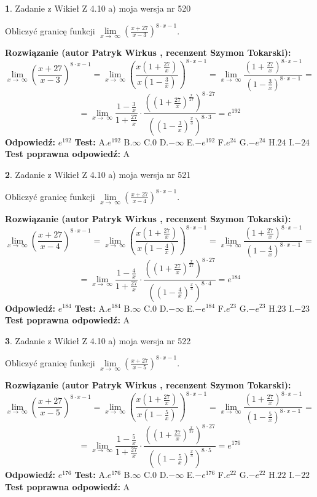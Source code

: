 \documentclass[12pt, a4paper]{article}
\theoremstyle{definition} %
\newtheorem{zad}{}
\newcommand{\zadStart}[1]{\begin{zad}#1\newline}
\newcommand{\zadStop}{\end{zad}}
\newcommand{\rozwStart}[2]{\noindent \textbf{Rozwiązanie (autor #1 , recenzent #2): }\newline}
\newcommand{\rozwStop}{\newline}
\newcommand{\odpStart}{\noindent \textbf{Odpowiedź:}\newline}
\newcommand{\odpStop}{\newline}
\newcommand{\testStart}{\noindent \textbf{Test:}\newline}
\newcommand{\testStop}{\newline}
\newcommand{\kluczStart}{\noindent \textbf{Test poprawna odpowiedź:}\newline}
\newcommand{\kluczStop}{\newline}
\begin{document}
\zadStart{Zadanie z Wikieł Z 4.10 a) moja wersja nr 520}

Obliczyć granicę funkcji  $\lim\limits_{x\to\ \infty}(\frac{x+27}{x-3})^{8\cdot x-1}$.
\zadStop
\rozwStart{Patryk Wirkus}{Szymon Tokarski}
$$\lim\limits_{x\to\ \infty}(\frac{x+27}{x-3})^{8\cdot x-1} = \lim\limits_{x\to\ \infty}(\frac{x(1+\frac{27}{x})}{x(1-\frac{3}{x})})^{8\cdot x-1}=\lim\limits_{x\to\ \infty}\frac{(1+\frac{27}{x})^{8\cdot x-1}}{(1-\frac{3}{x})^{8\cdot x-1}}=$$
$$=\lim\limits_{x\to\ \infty}\frac{1-\frac{3}{x}}{1+\frac{27}{x}}\cdot\frac{((1+\frac{27}{x})^{\frac{x}{27}})^{8\cdot27}}{((1-\frac{3}{x})^{\frac{x}{3}})^{8\cdot3}}=e^{192}$$
\rozwStop
\odpStart
$e^{192}$
\odpStop
\testStart
A.$e^{192}$ B.$\infty$ C.$0$ D.$-\infty$ E.$-e^{192}$
F.$e^{24}$ G.$-e^{24}$
H.$24$
I.$-24$
\testStop
\kluczStart
A
\kluczStop



\zadStart{Zadanie z Wikieł Z 4.10 a) moja wersja nr 521}

Obliczyć granicę funkcji  $\lim\limits_{x\to\ \infty}(\frac{x+27}{x-4})^{8\cdot x-1}$.
\zadStop
\rozwStart{Patryk Wirkus}{Szymon Tokarski}
$$\lim\limits_{x\to\ \infty}(\frac{x+27}{x-4})^{8\cdot x-1} = \lim\limits_{x\to\ \infty}(\frac{x(1+\frac{27}{x})}{x(1-\frac{4}{x})})^{8\cdot x-1}=\lim\limits_{x\to\ \infty}\frac{(1+\frac{27}{x})^{8\cdot x-1}}{(1-\frac{4}{x})^{8\cdot x-1}}=$$
$$=\lim\limits_{x\to\ \infty}\frac{1-\frac{4}{x}}{1+\frac{27}{x}}\cdot\frac{((1+\frac{27}{x})^{\frac{x}{27}})^{8\cdot27}}{((1-\frac{4}{x})^{\frac{x}{4}})^{8\cdot4}}=e^{184}$$
\rozwStop
\odpStart
$e^{184}$
\odpStop
\testStart
A.$e^{184}$ B.$\infty$ C.$0$ D.$-\infty$ E.$-e^{184}$
F.$e^{23}$ G.$-e^{23}$
H.$23$
I.$-23$
\testStop
\kluczStart
A
\kluczStop



\zadStart{Zadanie z Wikieł Z 4.10 a) moja wersja nr 522}

Obliczyć granicę funkcji  $\lim\limits_{x\to\ \infty}(\frac{x+27}{x-5})^{8\cdot x-1}$.
\zadStop
\rozwStart{Patryk Wirkus}{Szymon Tokarski}
$$\lim\limits_{x\to\ \infty}(\frac{x+27}{x-5})^{8\cdot x-1} = \lim\limits_{x\to\ \infty}(\frac{x(1+\frac{27}{x})}{x(1-\frac{5}{x})})^{8\cdot x-1}=\lim\limits_{x\to\ \infty}\frac{(1+\frac{27}{x})^{8\cdot x-1}}{(1-\frac{5}{x})^{8\cdot x-1}}=$$
$$=\lim\limits_{x\to\ \infty}\frac{1-\frac{5}{x}}{1+\frac{27}{x}}\cdot\frac{((1+\frac{27}{x})^{\frac{x}{27}})^{8\cdot27}}{((1-\frac{5}{x})^{\frac{x}{5}})^{8\cdot5}}=e^{176}$$
\rozwStop
\odpStart
$e^{176}$
\odpStop
\testStart
A.$e^{176}$ B.$\infty$ C.$0$ D.$-\infty$ E.$-e^{176}$
F.$e^{22}$ G.$-e^{22}$
H.$22$
I.$-22$
\testStop
\kluczStart
A
\kluczStop
\end{document}
